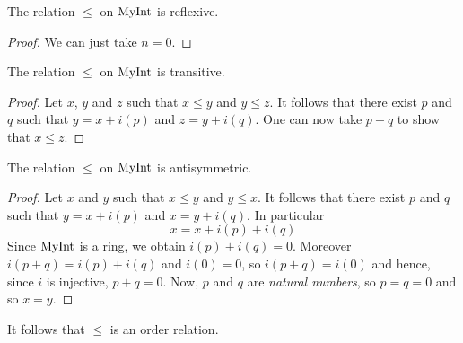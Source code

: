 \begin{lemma}
    \label{MyInt.le_refl}
    \leanok
    The relation $\leq$ on $\mathrm{MyInt}$ is reflexive.
\end{lemma}
\begin{proof}
    \leanok
    We can just take $n = 0$.
\end{proof}

\begin{lemma}
    \label{MyInt.le_trans}
    \leanok
    The relation $\leq$ on $\mathrm{MyInt}$ is transitive.
\end{lemma}
\begin{proof}
    \leanok
    Let $x$, $y$ and $z$ such that $x \leq y$ and $y \leq z$. It follows that there exist $p$ and $q$
    such that $y = x + i(p)$ and $z = y + i(q)$. One can now take $p+q$ to show that $x \leq z$.
\end{proof}

\begin{lemma}
    \label{MyInt.le_antisymm}
    \leanok
    The relation $\leq$ on $\mathrm{MyInt}$ is antisymmetric.
\end{lemma}
\begin{proof}
    \leanok
    Let $x$ and $y$ such that $x \leq y$ and $y \leq x$. It follows that there exist $p$ and $q$
    such that $y = x + i(p)$ and $x = y + i(q)$. In particular
    \[
    x = x + i(p) + i(q)
    \]
    Since $\mathrm{MyInt}$ is a ring, we obtain $i(p)+i(q) = 0$. Moreover $i(p+q)=i(p)+i(q)$ and $i(0)=0$, so
    $i(p+q)=i(0)$ and hence, since $i$ is injective, $p+q = 0$. Now, $p$ and $q$ are \emph{natural numbers}, so $p=q=0$ and so $x=y$.
\end{proof}

It follows that $\leq$ is an order relation.

